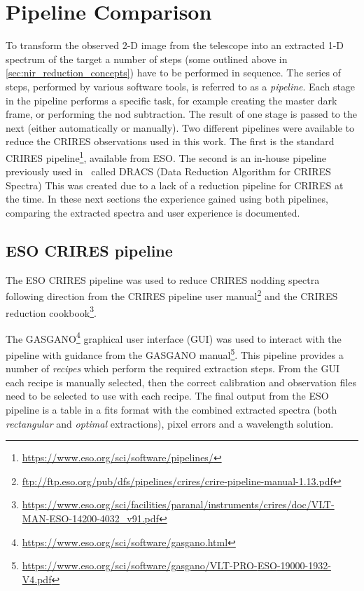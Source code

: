 
\section{Pipeline Comparison}
\label{sec:pipelines}
To transform the observed 2-D image from the telescope into an extracted 1-D spectrum of the target a number of steps (some outlined above in \cref{sec:nir_reduction_concepts}) have to be performed in sequence.
The series of steps, performed by various software tools, is referred to as a \emph{pipeline}.
Each stage in the pipeline performs a specific task, for example creating the master dark frame, or performing the nod subtraction.
The result of one stage is passed to the next (either automatically or manually).
Two different pipelines were available to reduce the {CRIRES} observations used in this work.
The first is the standard {CRIRES} pipeline\footnote{\href{https://www.eso.org/sci/software/pipelines/}{https://www.eso.org/sci/software/pipelines/}}, available from {ESO}.
The second is an in-house pipeline previously used in~\citet{figueira_radial_2010} called {DRACS} (Data Reduction Algorithm for {CRIRES} Spectra)
This was created due to a lack of a reduction pipeline for CRIRES at the time.
In these next sections the experience gained using both pipelines, comparing the extracted spectra and user experience is documented.


\subsection{{ESO} {CRIRES} pipeline}
\label{subsec:eso-crires}
The {ESO} {CRIRES} pipeline was used to reduce {CRIRES} nodding spectra following direction from the {CRIRES} pipeline user manual\footnote{\href{ftp://ftp.eso.org/pub/dfs/pipelines/crires/crire-pipeline-manual-1.13.pdf}{ftp://ftp.eso.org/pub/dfs/pipelines/crires/crire-pipeline-manual-1.13.pdf}} and the {CRIRES} reduction cookbook\footnote{\href{https://www.eso.org/sci/facilities/paranal/instruments/crires/doc/VLT-MAN-{ESO}-14200-4032\_v91.pdf}{https://www.eso.org/sci/facilities/paranal/instruments/crires/doc/VLT-MAN-{ESO}-14200-4032\_v91.pdf}}.

The GASGANO\footnote{\href{https://www.eso.org/sci/software/gasgano.html}{https://www.eso.org/sci/software/gasgano.html}} graphical user interface (GUI) was used to interact with the pipeline with guidance from the {GASGANO} manual\footnote{\href{https://www.eso.org/sci/software/gasgano/VLT-PRO-{ESO}-19000-1932-V4.pdf}{https://www.eso.org/sci/software/gasgano/VLT-PRO-{ESO}-19000-1932-V4.pdf}}.
This pipeline provides a number of \emph{recipes} which perform the required extraction steps.
From the GUI each recipe is manually selected, then the correct calibration and observation files need to be selected to use with each recipe.
The final output from the {ESO} pipeline is a table in a fits format with the combined extracted spectra (both \emph{rectangular} and \emph{optimal} extractions), pixel errors and a wavelength solution.

